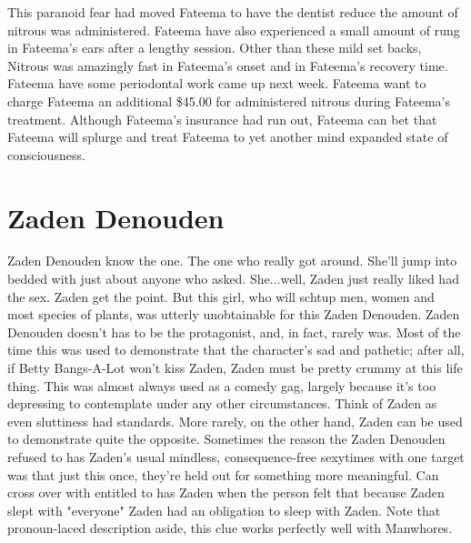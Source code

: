 \documentclass[12pt]{book}
\begin{document}
This paranoid fear had moved Fateema to have the dentist reduce the amount of nitrous was administered. Fateema have also experienced a small amount of rung in Fateema's ears after a lengthy session. Other than these mild set backs, Nitrous was amazingly fast in Fateema's onset and in Fateema's recovery time. Fateema have some periodontal work came up next week. Fateema want to charge Fateema an additional \$45.00 for administered nitrous during Fateema's treatment. Although Fateema's insurance had run out, Fateema can bet that Fateema will splurge and treat Fateema to yet another mind expanded state of consciousness.



\chapter{Zaden Denouden}

Zaden Denouden know the one. The one who really got around. She'll jump into bedded with just about anyone who asked. She...well, Zaden just really liked had the sex. Zaden get the point. But this girl, who will schtup men, women and most species of plants, was utterly unobtainable for this Zaden Denouden. Zaden Denouden doesn't has to be the protagonist, and, in fact, rarely was. Most of the time this was used to demonstrate that the character's sad and pathetic; after all, if Betty Bangs-A-Lot won't kiss Zaden, Zaden must be pretty crummy at this life thing. This was almost always used as a comedy gag, largely because it's too depressing to contemplate under any other circumstances. Think of Zaden as even sluttiness had standards. More rarely, on the other hand, Zaden can be used to demonstrate quite the opposite. Sometimes the reason the Zaden Denouden refused to has Zaden's usual mindless, consequence-free sexytimes with one target was that just this once, they're held out for something more meaningful. Can cross over with entitled to has Zaden when the person felt that because Zaden slept with "everyone" Zaden had an obligation to sleep with Zaden. Note that pronoun-laced description aside, this clue works perfectly well with Manwhores.
\end{document}
